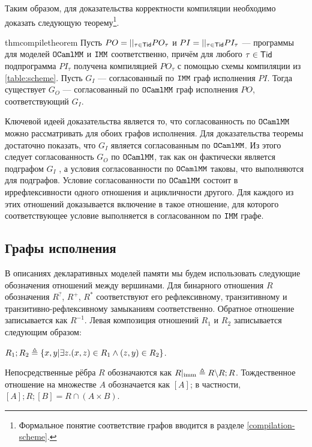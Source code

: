 Таким образом, для доказательства корректности компиляции необходимо доказать
следующую теорему\footnote{Формальное понятие соответствие графов вводится в разделе \ref{compilation-scheme}.}.

\begin{restatable}{thm}{compiletheorem}
  \label{prop:compile-theorem}
  Пусть $PO=||_{\tau\in \mathsf{Tid}} PO_\tau$ и $PI=||_{\tau\in \mathsf{Tid}} PI_\tau$ --- программы для моделей $\mathtt{OCaml}\allowbreak \mathtt{MM}$ и $\mathtt{IMM}$ соответственно, причём для любого $\tau \in \mathsf{Tid}$ подпрограмма $PI_\tau$ получена компиляцией $PO_\tau$ с помощью схемы компиляции из \cref{table:scheme}. Пусть $G_I$ --- согласованный по $\mathtt{IMM}$ граф исполнения $PI$. Тогда существует $G_O$ --- согласованный по $\mathtt{OCaml}\allowbreak \mathtt{MM}$ граф исполнения $PO$, соответствующий $G_I$. 
\end{restatable}


Ключевой идеей доказательства является то, что согласованность по $\mathtt{OCaml}\allowbreak \mathtt{MM}$ можно рассматривать для обоих графов исполнения. Для доказательства теоремы достаточно показать, что $G_I$ является согласованным по $\mathtt{OCaml}\allowbreak \mathtt{MM}$. Из этого следует согласованность $G_O$ по $\mathtt{OCaml}\allowbreak \mathtt{MM}$, так как он фактически является подграфом $G_I$ , а условия согласованности по $\mathtt{OCaml}\allowbreak \mathtt{MM}$ таковы, что выполняются для подграфов. Условие согласованности по $\mathtt{OCaml}\allowbreak \mathtt{MM}$ состоит в иррефлексивности одного отношения и ацикличности другого. Для каждого из этих отношений доказывается включение в такое отношение, для которого соответствующее условие выполняется в согласованном по $\mathtt{IMM}$ графе.

\subsection{Графы исполнения}
\label{exec-graphs}

В описаниях декларативных моделей памяти мы будем использовать следующие обозначения отношений между вершинами. Для бинарного отношения $R$ обозначения $R^?$, $R^{+}$, $R^{*}$ соответствуют его рефлексивному, транзитивному и транзитивно-рефлексивному замыканиям соответственно. Обратное отношение записывается как $R^{-1}$. Левая композиция отношений $R_1$ и $R_2$ записывается следующим образом:

$R_1;R_2 \triangleq \{{x, y | \exists z. (x, z) \in R_1 \land (z, y) \in R_2}\}$.

Непосредственные рёбра $R$ обозначаются как ${R}{|_{\text{imm}}} \triangleq R \backslash R;R$. Тождественное отношение на множестве $A$ обозначается как $[A]$; в частности, $[A];R;[B] = R \cap (A \times B)$.

